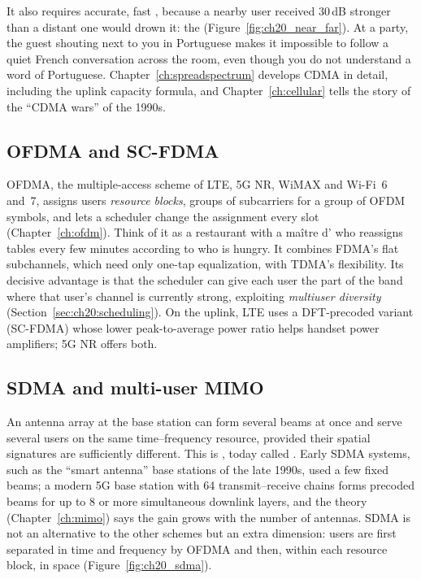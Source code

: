 It also requires accurate, fast , because a nearby user received 30\,dB stronger
than a distant one would drown it: the  (Figure~\ref{fig:ch20_near_far}). At a
party, the guest shouting next to you in Portuguese makes it impossible to follow a quiet French
conversation across the room, even though you do not understand a word of Portuguese.
Chapter~\ref{ch:spreadspectrum} develops CDMA in detail, including the uplink capacity formula, and
Chapter~\ref{ch:cellular} tells the story of the ``CDMA wars'' of the 1990s.


\subsection{OFDMA and SC-FDMA}

OFDMA, the multiple-access scheme of LTE, 5G NR, WiMAX and Wi-Fi~6 and~7, assigns users
\emph{resource blocks}, groups of subcarriers for a group of OFDM symbols, and lets a scheduler change
the assignment every slot (Chapter~\ref{ch:ofdm}). Think of it as a restaurant with a maître d' who
reassigns tables every few minutes according to who is hungry. It combines FDMA's flat subchannels,
which need only one-tap equalization, with TDMA's flexibility. Its decisive advantage is that the
scheduler can give each user the part of the band where that user's channel is currently strong,
exploiting \emph{multiuser diversity} (Section~\ref{sec:ch20:scheduling}). On the uplink, LTE uses a
DFT-precoded variant (SC-FDMA) whose lower peak-to-average power ratio helps handset power amplifiers;
5G NR offers both.

\subsection{SDMA and multi-user MIMO}

An antenna array at the base station can form several beams at once and serve several users on the
same time--frequency resource, provided their spatial signatures are sufficiently different. This is
, today called . Early SDMA systems, such as
the ``smart antenna'' base stations of the late 1990s, used a few fixed beams; a modern 5G base
station with 64 transmit--receive chains forms precoded beams for up to 8 or more simultaneous downlink
layers, and the theory (Chapter~\ref{ch:mimo}) says the gain grows with the number of antennas. SDMA
is not an alternative to the other schemes but an extra dimension: users are first separated in time
and frequency by OFDMA and then, within each resource block, in space (Figure~\ref{fig:ch20_sdma}).

